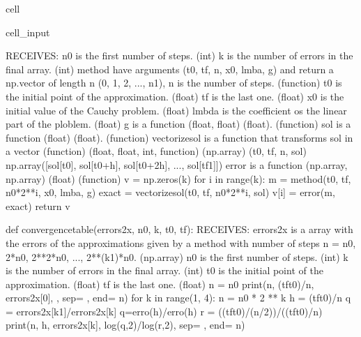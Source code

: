 \documentclass[letterpaper,10pt,english]{jupyterBook}
\begin{document}
\begin{sphinxuseclass}{cell}
\begin{sphinxVerbatimInput}
\begin{sphinxuseclass}{cell_input}
\begin{sphinxVerbatim}[commandchars=\\\{\}]
  RECEIVES:
  n0 is the first number of steps. (int)
  k is the number of errors in the final array. (int)
  method have arguments (t0, tf, n, x0, lmba, g) and return a
  np.vector of length n (0, 1, 2, ..., n\PYGZhy{}1), n is the number of steps. (function)
  t0 is the initial point of the approximation. (float)
  tf is the last one. (float)
  x0 is the initial value of the Cauchy problem. (float)
  lmbda is the coefficient os the linear part of the ploblem. (float)
  g is a function (float, float) \PYGZhy{}\PYGZgt{} (float). (function)
  sol is a function (float) \PYGZhy{}\PYGZgt{} (float). (function)
  vectorize\PYGZus{}sol is a function that \PYGZdq{}transforms sol in a vector\PYGZdq{} (function)
  (float, float, int, function) \PYGZhy{}\PYGZgt{} (np.array)
  (t0, tf, n, sol) \PYGZhy{}\PYGZgt{} np.array([sol[t0], sol[t0+h], sol[t0+2h], ..., sol[tf\PYGZhy{}1]])
  error is a function (np.array, np.array) \PYGZhy{}\PYGZgt{} (float) (function)
  \PYGZsq{}\PYGZsq{}\PYGZsq{}
  v = np.zeros(k)
  for i in range(k):
    m = method(t0, tf, n0*2**i, x0, lmba, g)
    exact = vectorize\PYGZus{}sol(t0, tf, n0*2**i, sol)
    v[i] = error(m, exact)
  return v

def convergence\PYGZus{}table(errors\PYGZus{}2x, n0, k, t0, tf):
  \PYGZsq{}\PYGZsq{}\PYGZsq{}
  RECEIVES:
  errors\PYGZus{}2x is a array with the errors of the approximations given
  by a method with number of steps n = n0, 2*n0, 2**2*n0, ..., 2**(k\PYGZhy{}1)*n0. (np.array)
  n0 is the first number of steps. (int)
  k is the number of errors in the final array. (int)
  t0 is the initial point of the approximation. (float)
  tf is the last one. (float)
  \PYGZsq{}\PYGZsq{}\PYGZsq{}
  n = n0
  print(n, (tf\PYGZhy{}t0)/n, errors\PYGZus{}2x[0], \PYGZdq{}\PYGZhy{}\PYGZdq{}, sep=\PYGZdq{} \PYGZam{} \PYGZdq{}, end=\PYGZdq{} \PYGZbs{}\PYGZbs{}\PYGZbs{}\PYGZbs{} \PYGZbs{}n\PYGZdq{})
  for k in range(1, 4):
      n = n0 * 2 ** k
      h = (tf\PYGZhy{}t0)/n
      q = errors\PYGZus{}2x[k\PYGZhy{}1]/errors\PYGZus{}2x[k] \PYGZsh{}q=erro(h)/erro(h)
      r = ((tf\PYGZhy{}t0)/(n/2))/((tf\PYGZhy{}t0)/n)
      print(n, h, errors\PYGZus{}2x[k], log(q,2)/log(r,2), sep=\PYGZdq{} \PYGZam{} \PYGZdq{}, end=\PYGZdq{} \PYGZbs{}\PYGZbs{}\PYGZbs{}\PYGZbs{} \PYGZbs{}n\PYGZdq{})
\end{sphinxVerbatim}

\end{sphinxuseclass}\end{sphinxVerbatimInput}

\end{sphinxuseclass}
\end{document}
